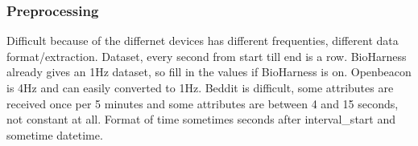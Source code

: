 		\subsubsection{Preprocessing}
			Difficult because of the differnet devices has different frequenties, different data format/extraction. 
			Dataset, every second from start till end is a row. BioHarness already gives an 1Hz dataset, so fill in the values if BioHarness is on. 
			Openbeacon is 4Hz and can easily converted to 1Hz.
			Beddit is difficult, some attributes are received once per 5 minutes and some attributes are between 4 and 15 seconds, not constant at all. Format of time sometimes seconds after interval\_start and sometime datetime.
		
